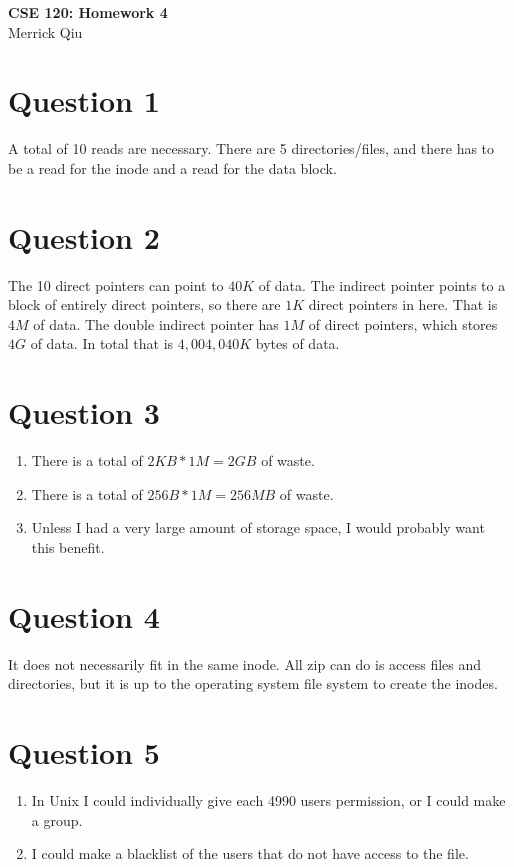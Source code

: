 \documentclass{article}
\begin{document}
\begin{center}
	\huge{\bf CSE 120: Homework 4} \\
	Merrick Qiu
\end{center}
\section*{Question 1}
A total of 10 reads are necessary.
There are 5 directories/files,
and there has to be a read for the inode and 
a read for the data block.

\section*{Question 2}
The 10 direct pointers can point to 
$40K$ of data. The indirect pointer 
points to a block of entirely direct pointers,
so there are $1K$ direct pointers in here. That is $4M$ of data.
The double indirect pointer has $1M$ of direct pointers,
which stores $4G$ of data.
In total that is $4,004,040K$ bytes of data.

\section*{Question 3}
\begin{enumerate}
    \item There is a total of $2KB * 1M = 2GB$ of waste.
    \item There is a total of $256B * 1M = 256MB$ of waste.
    \item Unless I had a very large amount of storage space,
    I would probably want this benefit.
\end{enumerate}

\section*{Question 4}
It does not necessarily fit in the same inode.
All zip can do is access files and directories,
but it is up to the operating system file system 
to create the inodes.

\section*{Question 5}
\begin{enumerate}
    \item In Unix I could individually
    give each 4990 users permission, or I could make a group.
    \item I could make a blacklist of the users that do not 
    have access to the file.
\end{enumerate}
\end{document}
